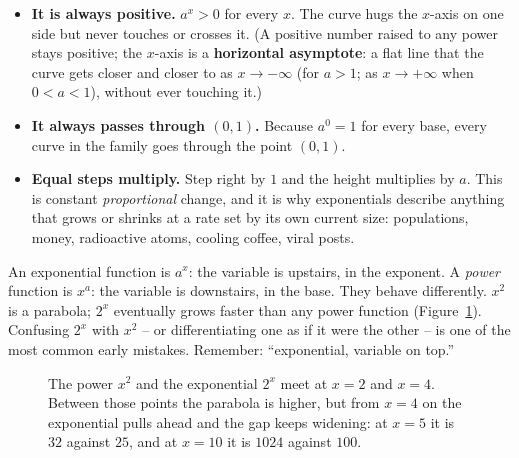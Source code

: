 \begin{itemize}
\item \textbf{It is always positive.} $a^x>0$ for every $x$. The curve hugs the $x$-axis on one side but never touches or crosses it. (A positive number raised to any power stays positive; the $x$-axis is a \textbf{horizontal asymptote}: a flat line that the curve gets closer and closer to as $x \to -\infty$ (for $a>1$; as $x\to+\infty$ when $0<a<1$), without ever touching it.)
\item \textbf{It always passes through $(0,1)$.} Because $a^0=1$ for every base, every curve in the family goes through the point $(0,1)$.
\item \textbf{Equal steps multiply.} Step right by $1$ and the height multiplies by $a$. This is constant \emph{proportional} change, and it is why exponentials describe anything that grows or shrinks at a rate set by its own current size: populations, money, radioactive atoms, cooling coffee, viral posts.
\end{itemize}

\begin{trapbox}
An exponential function is $a^x$: the variable is upstairs, in the exponent. A \emph{power} function is $x^a$: the variable is downstairs, in the base. They behave differently. $x^2$ is a parabola; $2^x$ eventually grows faster than any power function (Figure~\ref{ch03:fig-power-vs-exp}). Confusing $2^x$ with $x^2$ -- or differentiating one as if it were the other -- is one of the most common early mistakes. Remember: ``exponential, variable on top.''
\end{trapbox}

\begin{figure}[htbp]
\centering
{}
\caption{The power $x^2$ and the exponential $2^x$ meet at $x=2$ and $x=4$. Between those points the parabola is higher, but from $x=4$ on the exponential pulls ahead and the gap keeps widening: at $x=5$ it is $32$ against $25$, and at $x=10$ it is $1024$ against $100$.}
\label{ch03:fig-power-vs-exp}
\end{figure}

